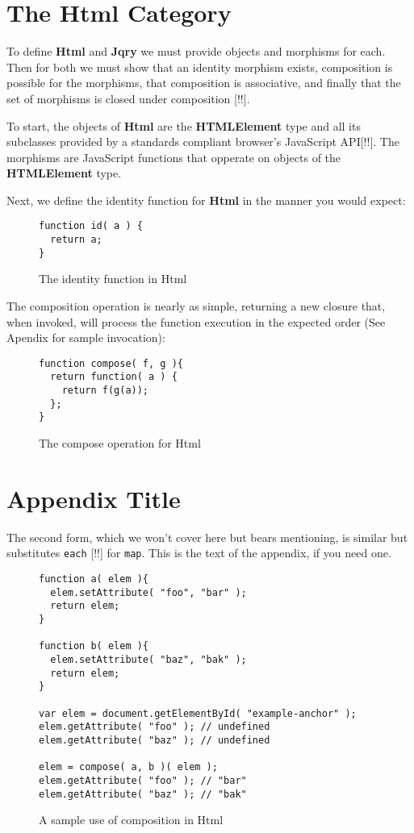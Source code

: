 \documentclass[preprint]{sigplanconf}
\begin{document}
\section{The Html Category}

To define \textbf{Html} and \textbf{Jqry} we must provide objects and morphisms for each. Then for both we must show that an identity morphism exists, composition is possible for the morphisms, that composition is associative, and finally that the set of morphisms is closed under composition [!!].

To start, the objects of \textbf{Html} are the \textbf{HTMLElement} type and all its subclasses provided by a standards compliant browser's JavaScript API[!!]. The morphisms are JavaScript functions that opperate on objects of the \textbf{HTMLElement} type.

Next, we define the identity function for \textbf{Html} in the manner you would expect:

\begin{figure}[h!]
\begin{verbatim}
function id( a ) {
  return a;
}
\end{verbatim}
\caption{The identity function in Html}
\end{figure}

The composition operation is nearly as simple, returning a new closure that, when invoked, will process the function execution in the expected order (See Apendix for sample invocation):

\begin{figure}[h!]
\begin{verbatim}
function compose( f, g ){
  return function( a ) {
    return f(g(a));
  };
}
\end{verbatim}
\caption{The compose operation for Html}
\end{figure}


\appendix
\section{Appendix Title}


The second form, which we won't cover here but bears mentioning, is similar but substitutes \verb|each| [!!] for \verb|map|.
This is the text of the appendix, if you need one.

\begin{figure}[h!]
\begin{verbatim}
function a( elem ){
  elem.setAttribute( "foo", "bar" );
  return elem;
}

function b( elem ){
  elem.setAttribute( "baz", "bak" );
  return elem;
}

var elem = document.getElementById( "example-anchor" );
elem.getAttribute( "foo" ); // undefined
elem.getAttribute( "baz" ); // undefined

elem = compose( a, b )( elem );
elem.getAttribute( "foo" ); // "bar"
elem.getAttribute( "baz" ); // "bak"
\end{verbatim}
\caption{A sample use of composition in Html}
\end{figure}
\end{document}
